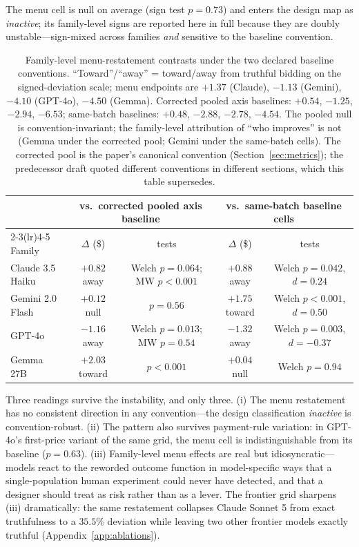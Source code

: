 The menu cell is null on average (sign test $p = 0.73$) and enters the design map as \emph{inactive}; its family-level signs are reported here in full because they are doubly unstable---sign-mixed across families \emph{and} sensitive to the baseline convention.

\begin{table}[htbp]
\centering
\footnotesize
\begin{tabular}{l cc cc}
\toprule
& \multicolumn{2}{c}{vs.\ corrected pooled axis baseline} & \multicolumn{2}{c}{vs.\ same-batch baseline cells} \\
\cmidrule(lr){2-3}\cmidrule(lr){4-5}
Family & $\Delta$ (\$) & tests & $\Delta$ (\$) & tests \\
\midrule
Claude 3.5 Haiku & $+0.82$ away & Welch $p=0.064$; MW $p<0.001$ & $+0.88$ away & Welch $p=0.042$, $d=0.24$ \\
Gemini 2.0 Flash & $+0.12$ null & $p=0.56$ & $+1.75$ toward & Welch $p<0.001$, $d=0.50$ \\
GPT-4o & $-1.16$ away & Welch $p=0.013$; MW $p=0.54$ & $-1.32$ away & Welch $p=0.003$, $d=-0.37$ \\
Gemma 27B & $+2.03$ toward & $p<0.001$ & $+0.04$ null & Welch $p=0.94$ \\
\bottomrule
\end{tabular}
\caption{Family-level menu-restatement contrasts under the two declared baseline conventions. ``Toward''/``away'' = toward/away from truthful bidding on the signed-deviation scale; menu endpoints are $+1.37$ (Claude), $-1.13$ (Gemini), $-4.10$ (GPT-4o), $-4.50$ (Gemma). Corrected pooled axis baselines: $+0.54$, $-1.25$, $-2.94$, $-6.53$; same-batch baselines: $+0.48$, $-2.88$, $-2.78$, $-4.54$. The pooled null is convention-invariant; the family-level attribution of ``who improves'' is not (Gemma under the corrected pool; Gemini under the same-batch cells). The corrected pool is the paper's canonical convention (Section~\ref{sec:metrics}); the predecessor draft quoted different conventions in different sections, which this table supersedes.}
\label{tab:menu-conventions}
\end{table}

Three readings survive the instability, and only three. (i) The menu restatement has no consistent direction in any convention---the design classification \emph{inactive} is convention-robust. (ii) The pattern also survives payment-rule variation: in GPT-4o's first-price variant of the same grid, the menu cell is indistinguishable from its baseline ($p = 0.63$). (iii) Family-level menu effects are real but idiosyncratic---models react to the reworded outcome function in model-specific ways that a single-population human experiment could never have detected, and that a designer should treat as risk rather than as a lever. The frontier grid sharpens (iii) dramatically: the same restatement collapses Claude Sonnet 5 from exact truthfulness to a $35.5\%$ deviation while leaving two other frontier models exactly truthful (Appendix~\ref{app:ablations}).

